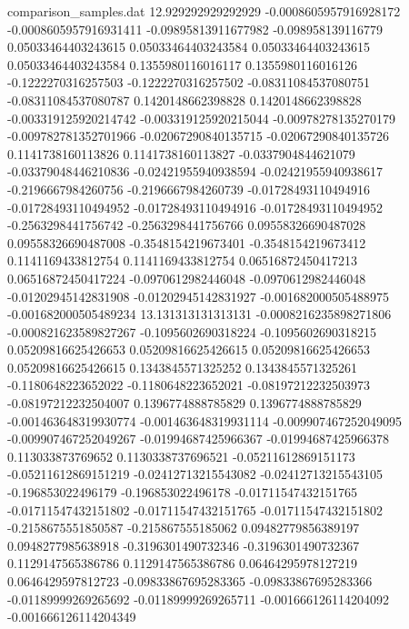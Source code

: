 \begin{filecontents}{comparison_samples.dat}
12.929292929292929  -0.0008605957916928172  -0.0008605957916931411  -0.09895813911677982   -0.098958139116779     0.05033464403243615    0.05033464403243584    0.05033464403243615    0.05033464403243584    0.1355980116016117     0.1355980116016126     -0.1222270316257503     -0.1222270316257502     -0.08311084537080751   -0.08311084537080787   0.1420148662398828      0.1420148662398828      -0.003319125920214742   -0.003319125920215044   -0.00978278135270179    -0.009782781352701966   -0.02067290840135715    -0.02067290840135726    0.1141738160113826      0.1141738160113827      -0.0337904844621079     -0.03379048446210836    -0.02421955940938594   -0.02421955940938617   -0.2196667984260756    -0.2196667984260739    -0.01728493110494916    -0.01728493110494952    -0.01728493110494916    -0.01728493110494952    -0.2563298441756742    -0.2563298441756766    0.09558326690487028     0.09558326690487008     -0.3548154219673401    -0.3548154219673412    0.1141169433812754      0.1141169433812754      0.06516872450417213     0.06516872450417224     -0.0970612982446048    -0.0970612982446048    -0.01202945142831908   -0.01202945142831927   -0.001682000505488975   -0.001682000505489234 
13.131313131313131  -0.0008216235898271806  -0.000821623589827267   -0.1095602690318224    -0.1095602690318215    0.05209816625426653    0.05209816625426615    0.05209816625426653    0.05209816625426615    0.1343845571325252     0.1343845571325261     -0.1180648223652022     -0.1180648223652021     -0.08197212232503973   -0.08197212232504007   0.1396774888785829      0.1396774888785829      -0.001463648319930774   -0.001463648319931114   -0.009907467252049095   -0.009907467252049267   -0.01994687425966367    -0.01994687425966378    0.113033873769652       0.1130338737696521      -0.05211612869151173    -0.05211612869151219    -0.02412713215543082   -0.02412713215543105   -0.196853022496179     -0.196853022496178     -0.01711547432151765    -0.01711547432151802    -0.01711547432151765    -0.01711547432151802    -0.2158675551850587    -0.215867555185062     0.09482779856389197     0.0948277985638918      -0.3196301490732346    -0.3196301490732367    0.1129147565386786      0.1129147565386786      0.06464295978127219     0.0646429597812723      -0.09833867695283365   -0.09833867695283366   -0.01189999269265692   -0.01189999269265711   -0.001666126114204092   -0.001666126114204349 

\end{filecontents}
